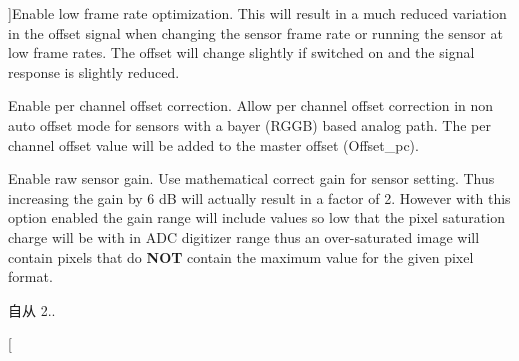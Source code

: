 \begin{Desc}
\begin{description}
{}]Enable low frame rate optimization. This will result in a much reduced variation in the offset signal when changing the sensor frame rate or running the sensor at low frame rates. The offset will change slightly if switched on and the signal response is slightly reduced. \item[{\em 
\hypertarget{group___device_specific_interface_ggad8cdd91ea42682e1055b0fb168f2ea58a2f124aa52668fbf117fad6ec733b3826}{dao\+Enable\+Per\+Channel\+Offset\+Correction}\label{group___device_specific_interface_ggad8cdd91ea42682e1055b0fb168f2ea58a2f124aa52668fbf117fad6ec733b3826}
}]Enable per channel offset correction. Allow per channel offset correction in non auto offset mode for sensors with a bayer (R\+G\+G\+B) based analog path. The per channel offset value will be added to the master offset (Offset\+\_\+pc). \item[{\em 
\hypertarget{group___device_specific_interface_ggad8cdd91ea42682e1055b0fb168f2ea58a3b30c6bc2447c006c9fca115a24a2c55}{dao\+Use\+Raw\+Sensor\+Gain}\label{group___device_specific_interface_ggad8cdd91ea42682e1055b0fb168f2ea58a3b30c6bc2447c006c9fca115a24a2c55}
}]Enable raw sensor gain. Use mathematical correct gain for sensor setting. Thus increasing the gain by 6 d\+B will actually result in a factor of 2. However with this option enabled the gain range will include values so low that the pixel saturation charge will be with in A\+D\+C digitizer range thus an over-\/saturated image will contain pixels that do {\bfseries N\+O\+T} contain the maximum value for the given pixel format. \begin{DoxySince}{自从}
2.. 
\end{DoxySince}
\item[{\em 
}
\end{description}
\end{Desc}
